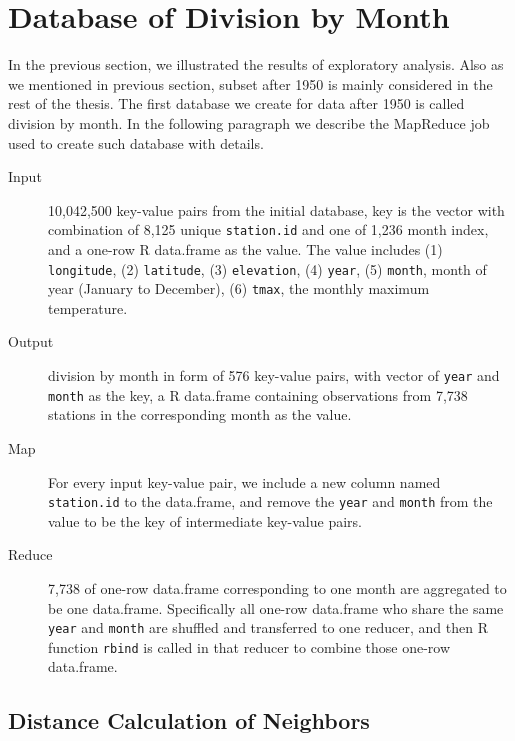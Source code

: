 \section{Database of Division by Month}

In the previous section, we illustrated the results of exploratory analysis. Also
as we mentioned in previous section, subset after 1950 is mainly considered in
the rest of the thesis.
The first database we create for data after 1950 is called division by month. In
the following paragraph we describe the MapReduce job used to create such 
database with details.

\begin{description}
  \item[Input] 10,042,500 key-value pairs from the initial database, key is the
  vector with combination of 8,125 unique \texttt{station.id} and one of 1,236 
  month index, and a one-row R data.frame as the value. The value includes 
  (1) \texttt{longitude}, (2) \texttt{latitude}, (3) \texttt{elevation}, (4) 
  \texttt{year}, (5) \texttt{month}, month of year (January to December), (6) 
  \texttt{tmax}, the monthly maximum temperature.
  \item[Output] division by month in form of 576 key-value pairs, with vector of
  \texttt{year} and \texttt{month} as the key, a R data.frame containing 
  observations from 7,738 stations in the corresponding month as the value.
  \item[Map]For every input key-value pair, we include a new column named 
  \texttt{station.id} to the data.frame, and remove the \texttt{year} and 
  \texttt{month} from the value to be the key of intermediate key-value pairs. 
  \item[Reduce] 7,738 of one-row data.frame corresponding to one month are 
  aggregated to be one data.frame. Specifically all one-row data.frame who share
  the same \texttt{year} and \texttt{month} are shuffled and transferred to one 
  reducer, and then R function \texttt{rbind} is called in that reducer to combine 
  those one-row data.frame.
\end{description}


\subsection{Distance Calculation of Neighbors}

